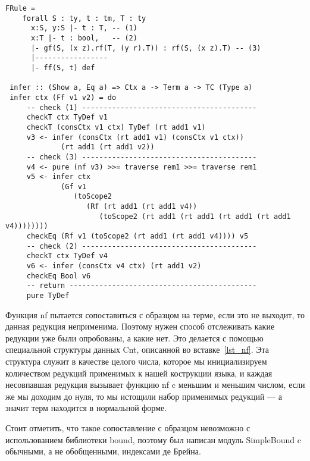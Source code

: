 \begin{lstlisting}[caption={Искусственный пример случая несоответствия контекстов: контекст t нужно сократить до использования в предпосылке.},label={FRule},captionpos=b, frame=single, float, floatplacement=H]
FRule =
    forall S : ty, t : tm, T : ty
      x:S, y:S |- t : T, -- (1)
      x:T |- t : bool,   -- (2)
      |- gf(S, (x z).rf(T, (y r).T)) : rf(S, (x z).T) -- (3)
      |-----------------
      |- ff(S, t) def

 infer :: (Show a, Eq a) => Ctx a -> Term a -> TC (Type a)
 infer ctx (Ff v1 v2) = do
     -- check (1) -----------------------------------------
     checkT ctx TyDef v1
     checkT (consCtx v1 ctx) TyDef (rt add1 v1)
     v3 <- infer (consCtx (rt add1 v1) (consCtx v1 ctx))
             (rt add1 (rt add1 v2))
     -- check (3) -----------------------------------------
     v4 <- pure (nf v3) >>= traverse rem1 >>= traverse rem1
     v5 <- infer ctx
             (Gf v1
                (toScope2
                   (Rf (rt add1 (rt add1 v4))
                      (toScope2 (rt add1 (rt add1 (rt add1 (rt add1 v4))))))))
     checkEq (Rf v1 (toScope2 (rt add1 (rt add1 v4)))) v5
     -- check (2) -----------------------------------------
     checkT ctx TyDef v4
     v6 <- infer (consCtx v4 ctx) (rt add1 v2)
     checkEq Bool v6
     -- return --------------------------------------------
     pure TyDef
\end{lstlisting}

Функция nf пытается сопоставиться с образцом на терме, если это не выходит, то данная редукция неприменима. Поэтому нужен способ отслеживать какие редукции уже были опробованы, а какие нет. Это делается с помощью специальной структуры данных Cnt, описанной во вставке~\ref{lst_nf}. Эта структура служит в качестве целого числа, которое мы инициализируем количеством редукций применимых к нашей кострукции языка, и каждая несовпавшая редукция вызывает функцию nf c меньшим и меньшим числом, если же мы доходим до нуля, то мы истощили набор применимых редукций --- а значит терм находится в нормальной форме.

Стоит отметить, что такое сопоставление с образцом невозможно с использованием библиотеки bound\cite{bound}, поэтому был написан модуль SimpleBound c обычными, а не обобщенными, индексами де Брейна.

